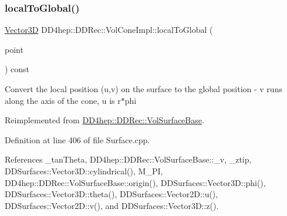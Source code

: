 \hypertarget{class_d_d4hep_1_1_d_d_rec_1_1_vol_cone_impl_af32c1efbead53b381287c82e3ce23755}{}\label{class_d_d4hep_1_1_d_d_rec_1_1_vol_cone_impl_af32c1efbead53b381287c82e3ce23755} 
\subsubsection{\texorpdfstring{local\+To\+Global()}{localToGlobal()}}
{\footnotesize\ttfamily \hyperlink{class_d_d_surfaces_1_1_vector3_d}{Vector3D} D\+D4hep\+::\+D\+D\+Rec\+::\+Vol\+Cone\+Impl\+::local\+To\+Global (\begin{DoxyParamCaption}\item[{const \hyperlink{class_d_d_surfaces_1_1_vector2_d}{Vector2D} \&}]{point }\end{DoxyParamCaption}) const\hspace{0.3cm}{\ttfamily [virtual]}}

Convert the local position (u,v) on the surface to the global position -\/ v runs along the axis of the cone, u is r$\ast$phi 

Reimplemented from \hyperlink{class_d_d4hep_1_1_d_d_rec_1_1_vol_surface_base_a9cf248895aeb84a7e2cd2b2068661397}{D\+D4hep\+::\+D\+D\+Rec\+::\+Vol\+Surface\+Base}.



Definition at line 406 of file Surface.\+cpp.



References \+\_\+tan\+Theta, D\+D4hep\+::\+D\+D\+Rec\+::\+Vol\+Surface\+Base\+::\+\_\+v, \+\_\+ztip, D\+D\+Surfaces\+::\+Vector3\+D\+::cylindrical(), M\+\_\+\+PI, D\+D4hep\+::\+D\+D\+Rec\+::\+Vol\+Surface\+Base\+::origin(), D\+D\+Surfaces\+::\+Vector3\+D\+::phi(), D\+D\+Surfaces\+::\+Vector3\+D\+::theta(), D\+D\+Surfaces\+::\+Vector2\+D\+::u(), D\+D\+Surfaces\+::\+Vector2\+D\+::v(), and D\+D\+Surfaces\+::\+Vector3\+D\+::z().

\hypertarget{class_d_d4hep_1_1_d_d_rec_1_1_vol_cone_impl_a0bdca94e1f57432f8b3d20c4cb1a3f7e}{}\label{class_d_d4hep_1_1_d_d_rec_1_1_vol_cone_impl_a0bdca94e1f57432f8b3d20c4cb1a3f7e} 
